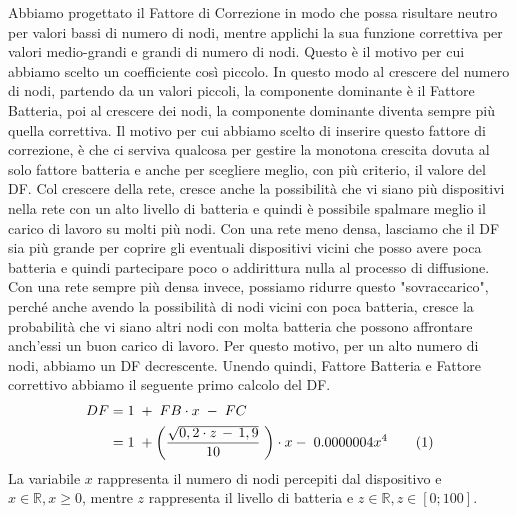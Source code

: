 Abbiamo progettato il Fattore di Correzione in modo che possa risultare neutro per valori bassi di numero di nodi, mentre applichi la sua funzione correttiva per valori medio-grandi e grandi di numero di nodi. Questo è il motivo per cui abbiamo scelto un coefficiente così piccolo. In questo modo al crescere del numero di nodi, partendo da un valori piccoli, la componente dominante è il Fattore Batteria, poi al crescere dei nodi, la componente dominante diventa sempre più quella correttiva. Il motivo per cui abbiamo scelto di inserire questo fattore di correzione, è che ci serviva qualcosa per gestire la monotona crescita dovuta al solo fattore batteria e anche per scegliere meglio, con più criterio, il valore del DF. Col crescere della rete, cresce anche la possibilità che vi siano più dispositivi nella rete con un alto livello di batteria e quindi è possibile spalmare meglio il carico di lavoro su molti più nodi. Con una rete meno densa, lasciamo che il DF sia più grande per coprire gli eventuali dispositivi vicini che posso avere poca batteria e quindi partecipare poco o addirittura nulla al processo di diffusione. Con una rete sempre più densa invece, possiamo ridurre questo "sovraccarico", perché anche avendo la possibilità di nodi vicini con poca batteria, cresce la probabilità che vi siano altri nodi con molta batteria che possono affrontare anch'essi un buon carico di lavoro. Per questo motivo, per un alto numero di nodi, abbiamo un DF decrescente.
Unendo quindi, Fattore Batteria e Fattore correttivo abbiamo il seguente primo calcolo del DF.
\begin{align*}
	\label{eq:DF_no_asint}
	DF &= 1 \; + \; FB\cdot x \; - \; FC\\
	&= 1 \; + \left( \dfrac{\sqrt{0,2\cdot z\,-\,1,9}}{10}\; \right) \cdot x- \; 0.0000004x^4 \addtocounter{equation}{1}\tag{\theequation}
\end{align*}
La variabile $\textit{x}$ rappresenta il numero di nodi percepiti dal dispositivo e $ \textit{x}\in\mathbb{R},x\geq0$, mentre $\textit{z}$ rappresenta il livello di batteria e $\textit{z}\in \mathbb{R}, \textit{z}\in[0;100]$.

